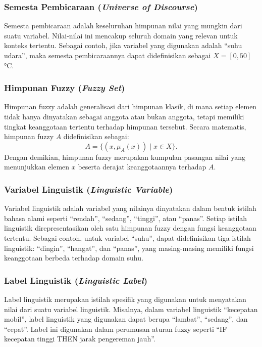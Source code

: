 \documentclass[12pt,a4paper]{article}
\theoremstyle{remark}
\begin{document}
\subsubsection{Semesta Pembicaraan (\textit{Universe of Discourse})}
Semesta pembicaraan adalah keseluruhan himpunan nilai yang mungkin dari suatu variabel. Nilai-nilai ini mencakup seluruh domain yang relevan untuk konteks tertentu.
Sebagai contoh, jika variabel yang digunakan adalah “suhu udara”, maka semesta pembicaraannya dapat didefinisikan sebagai \(X = [0, 50]\) °C.

\subsubsection{Himpunan Fuzzy (\textit{Fuzzy Set})}
Himpunan fuzzy adalah generalisasi dari himpunan klasik, di mana setiap elemen tidak hanya dinyatakan sebagai anggota atau bukan anggota, tetapi memiliki tingkat keanggotaan tertentu terhadap himpunan tersebut. Secara matematis, himpunan fuzzy \(A\) didefinisikan sebagai:
\[
    A = \{(x, \mu_A(x)) \mid x \in X\}.
\]
Dengan demikian, himpunan fuzzy merupakan kumpulan pasangan nilai yang menunjukkan elemen \(x\) beserta derajat keanggotaannya terhadap \(A\).

\subsubsection{Variabel Linguistik (\textit{Linguistic Variable})}
Variabel linguistik adalah variabel yang nilainya dinyatakan dalam bentuk istilah bahasa alami seperti “rendah”, “sedang”, “tinggi”, atau “panas”. Setiap istilah linguistik direpresentasikan oleh satu himpunan fuzzy dengan fungsi keanggotaan tertentu.
Sebagai contoh, untuk variabel “suhu”, dapat didefinisikan tiga istilah linguistik: “dingin”, “hangat”, dan “panas”, yang masing-masing memiliki fungsi keanggotaan berbeda terhadap domain suhu.

\subsubsection{Label Linguistik (\textit{Linguistic Label})}
Label linguistik merupakan istilah spesifik yang digunakan untuk menyatakan nilai dari suatu variabel linguistik. Misalnya, dalam variabel linguistik “kecepatan mobil”, label linguistik yang digunakan dapat berupa “lambat”, “sedang”, dan “cepat”. Label ini digunakan dalam perumusan aturan fuzzy seperti “IF kecepatan tinggi THEN jarak pengereman jauh”.
\end{document}
